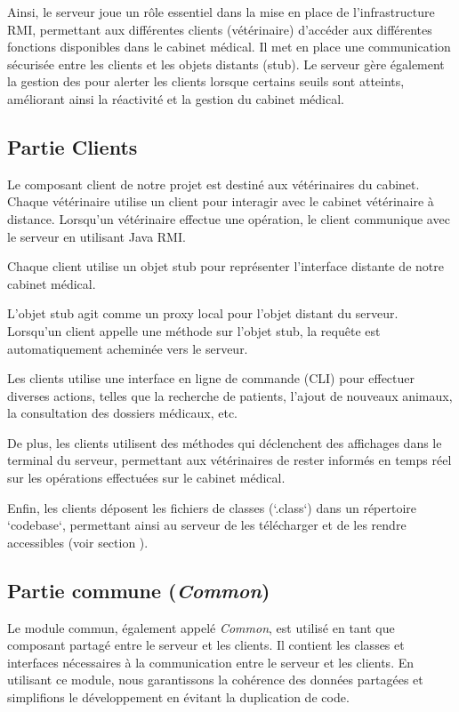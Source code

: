 \documentclass{article} %
\begin{document}
Ainsi, le serveur joue un rôle essentiel dans la mise en place de l'infrastructure RMI, 
permettant aux différentes clients (vétérinaire) d'accéder aux différentes fonctions disponibles 
dans le cabinet médical. Il met en place une communication sécurisée entre les clients 
et les objets distants (stub). 
Le serveur gère également la gestion des  pour alerter les clients lorsque 
certains seuils sont atteints, améliorant ainsi la réactivité et la gestion du cabinet médical.

\subsection{Partie Clients}

Le composant client de notre projet est destiné aux vétérinaires du cabinet. 
Chaque vétérinaire utilise un client pour interagir avec le cabinet vétérinaire à distance.
Lorsqu'un vétérinaire effectue une opération, le client communique avec le serveur en utilisant Java RMI.

Chaque client utilise un objet stub pour représenter l'interface distante de notre cabinet médical. 

L'objet stub agit comme un proxy local pour l'objet distant du serveur. 
Lorsqu'un client appelle une méthode sur l'objet stub, la requête est automatiquement acheminée vers le serveur.

Les clients utilise une interface en ligne de commande (CLI) pour effectuer diverses actions, 
telles que la recherche de patients, l'ajout de nouveaux animaux, la consultation des dossiers médicaux, 
etc.

De plus, les clients utilisent des méthodes qui déclenchent des affichages dans le terminal du serveur, 
permettant aux vétérinaires de rester informés en temps réel sur les opérations effectuées sur le cabinet médical.

Enfin, les clients déposent les fichiers de classes (`.class`) dans un répertoire `codebase`, 
permettant ainsi au serveur de les télécharger et de les rendre accessibles (voir section ).

\subsection{Partie commune (\textit{Common})}

Le module commun, également appelé \textit{Common}, est utilisé en tant que 
composant partagé entre le serveur et les clients. 
Il contient les classes et interfaces nécessaires à la communication entre le serveur et les clients. 
En utilisant ce module, nous garantissons la cohérence des données partagées et 
simplifions le développement en évitant la duplication de code. 
\end{document}
